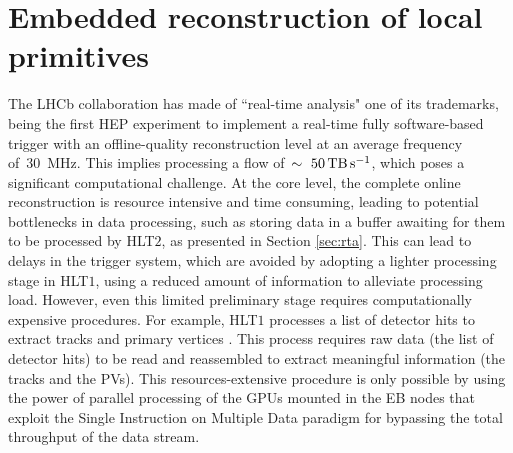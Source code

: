 
\chapter{Embedded reconstruction of local primitives}
\label{chp:retina}

The LHCb collaboration has made of ``real-time analysis" one of its trademarks, being the first HEP experiment to implement a real-time fully software-based trigger with an offline-quality reconstruction level at an average frequency of~\SI{30}{\mega\hertz}. This implies processing a flow of~$\sim~\SI{50}{\tera\byte\per\second}$, which poses a significant computational challenge.
At the core level, the complete online reconstruction is resource intensive and time consuming, leading to potential bottlenecks in data processing, such as storing data in a buffer awaiting for them to be processed by HLT$2$, as presented in Section \ref{sec:rta}. This can lead to delays in the trigger system, which are avoided by adopting a lighter processing stage in HLT$1$, using a reduced amount of information to alleviate processing load.
However, even this limited preliminary stage requires computationally expensive procedures. For example, HLT$1$ processes a list of detector hits to extract tracks and primary vertices \cite{https://doi.org/10.5281/zenodo.8119731}. This process requires raw data (the list of detector hits) to be read and reassembled to extract meaningful information (the tracks and the PVs). This resources-extensive procedure is only possible by using the power of parallel processing of the GPUs mounted in the EB nodes that exploit the Single Instruction on Multiple Data paradigm\cite{5009071} for bypassing the total throughput of the data stream.

